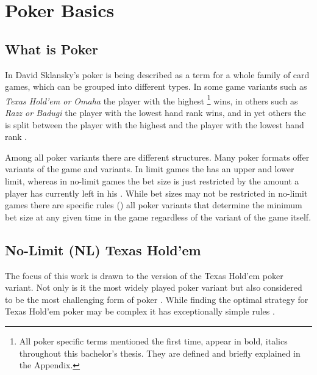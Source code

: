 

\chapter{Poker Basics}
\label{cha:pokerBasics}
\section{What is Poker}
In David Sklansky's \cite{theory_of_poker} poker is being described as a term for a whole family of card games, which can be grouped into different types. In some game variants such as  \textit{Texas Hold'em or Omaha} the player with the highest \footnote{All poker specific terms mentioned the first time, appear in bold, italics throughout this bachelor's thesis. They are defined and briefly explained in the Appendix.} wins, in others such as \textit{Razz or Badugi} the player with the lowest hand rank wins, and in yet others the  is split between the player with the highest and the player with the lowest hand rank .\par
Among all poker variants there are different  structures. Many poker formats offer  variants of the game and  variants. In limit games the  has an upper and lower limit, whereas in no-limit games the bet size is just restricted by the amount a player has currently left in his  \cite{theory_of_poker}. While bet sizes may not be restricted in no-limit games there are specific rules () all poker variants that determine the minimum bet size at any given time in the game regardless of the variant of the game itself.
\section{No-Limit (NL) Texas Hold'em}
The focus of this work is drawn to the  version of the Texas Hold'em poker variant. Not only is it the most widely played poker variant but also considered to be the most challenging form of poker \cite{strong_poker}. While finding the optimal strategy for Texas Hold'em poker may be complex it has exceptionally simple rules \cite{billings_phd}.
